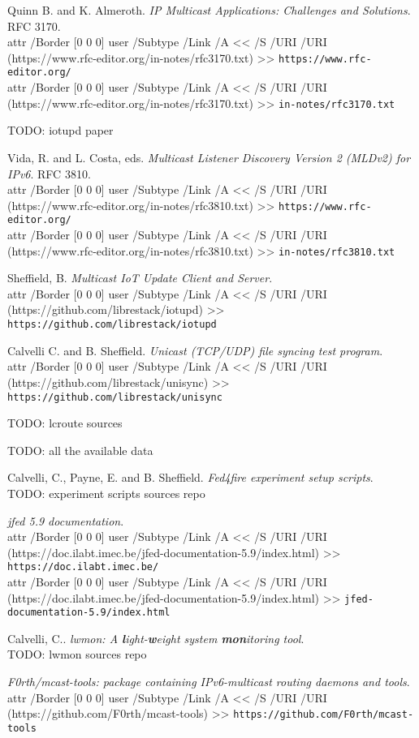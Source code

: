 \documentclass[a4paper,11pt,twocolumn]{article}
\newcommand{\longurl}[2]{%
\pdfstartlink %
attr {/Border [0 0 0]} %
user {/Subtype /Link /A << /S /URI /URI (#1) >>}%
{\footnotesize\tt #2}\pdfendlink}
\newcommand{\url}[1]{\longurl{#1}{#1}}
\newcommand{\url}[1]{{\footnotesize\tt #1}}
\newcommand{\longurl}[2]{{\footnotesize\tt #1}}
\begin{document}

\begin{thebibliography}{99}
\sloppy
{}

  Quinn B. and K. Almeroth.
  {\em IP Multicast Applications: Challenges and Solutions}.
  RFC 3170.\\
  \longurl{https://www.rfc-editor.org/in-notes/rfc3170.txt}%
  {https://www.rfc-editor.org/}\\
  \longurl{https://www.rfc-editor.org/in-notes/rfc3170.txt}%
  {in-notes/rfc3170.txt}

  TODO: iotupd paper

  Vida, R. and L. Costa, eds.
  {\em Multicast Listener Discovery Version 2 (MLDv2) for IPv6}.
  RFC 3810.\\
  \longurl{https://www.rfc-editor.org/in-notes/rfc3810.txt}%
  {https://www.rfc-editor.org/}\\
  \longurl{https://www.rfc-editor.org/in-notes/rfc3810.txt}%
  {in-notes/rfc3810.txt}

  Sheffield, B.
  {\em Multicast IoT Update Client and Server}.\\
  \url{https://github.com/librestack/iotupd}

  Calvelli C. and B. Sheffield.
  {\em Unicast (TCP/UDP) file syncing test program}.\\
  \url{https://github.com/librestack/unisync}

  TODO: lcroute sources

  TODO: all the available data

  Calvelli, C., Payne, E. and B. Sheffield.
  {\em Fed4fire experiment setup scripts}.\\
  TODO: experiment scripts sources repo

  {\em jfed 5.9 documentation}.\\
  \longurl{https://doc.ilabt.imec.be/jfed-documentation-5.9/index.html}%
  {https://doc.ilabt.imec.be/}\\
  \longurl{https://doc.ilabt.imec.be/jfed-documentation-5.9/index.html}%
  {jfed-documentation-5.9/index.html}

  Calvelli, C..
  {\em lwmon: A {\bf\em l}ight-{\bf\em w}eight system {\bf\em mon}itoring tool}.\\
  TODO: lwmon sources repo

  {\em F0rth/mcast-tools: package containing IPv6-multicast
  routing daemons and tools}.\\
  \url{https://github.com/F0rth/mcast-tools}


\end{thebibliography}
\end{document}
